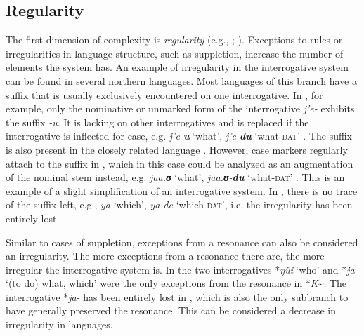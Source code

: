 \documentclass[output=paper,hidelinks]{langscibook}
\begin{document}
\subsection{Regularity}
The first dimension of complexity is \textit{regularity} (e.g., \citealt[33--35]{McWhorter2007}; \citealt[85ff.]{Trudgill2011}). Exceptions to rules or irregularities in language structure, such as suppletion, increase the number of elements the system has. An example of irregularity in the interrogative system can be found in several northern  languages. Most languages of this branch have a suffix that is usually exclusively encountered on one interrogative. In , for example, only the nominative or unmarked form of the interrogative \textit{j'e-} exhibits the suffix \textit{-u}. It is lacking on other interrogatives and is replaced if the interrogative is inflected for case, e.g. \textit{j'e-\textbf{u}} `what', \textit{j'e-\textbf{du}} `what-\textsc{dat}' \citep[348]{NikolaevaTolskaya2001}. The suffix is also present in the closely related language . However, case markers regularly attach to the suffix in , which in this case could be analyzed as an augmentation of the nominal stem instead, e.g. \textit{jaa.\textbf{ʊ}} `what', \textit{jaa.\textbf{ʊ}-\textbf{du}} `what-\textsc{dat}' \citep[197]{AvrorinBoldyrev2001}. This is an example of a slight simplification of an interrogative system. In , there is no trace of the suffix left, e.g., \textit{ya} `which', \textit{ya-de} `which-\textsc{dat}', i.e. the irregularity has been entirely lost.

Similar to cases of suppletion, exceptions from a resonance can also be considered an irregularity. The more exceptions from a resonance there are, the more irregular the interrogative system is. In  the two interrogatives *\textit{ŋüi} `who' and *\textit{ja-} `(to do) what, which' were the only exceptions from the resonance in *\textit{K}\textasciitilde. The interrogative *\textit{ja-} has been entirely lost in , which is also the only subbranch to have generally preserved the resonance. This can be considered a decrease in irregularity in  languages.
\end{document}
